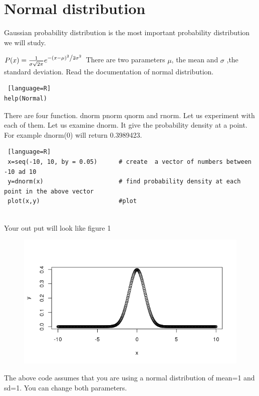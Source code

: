 \documentclass["../Applied_probabillity _and_statistics_lab_KTU.tex"]{subfiles}
\begin{document}
 \section{Normal distribution}
 Gaussian probability distribution is the most important probability distribution we will study.

 
 $P(x) = \frac{1}{{\sigma \sqrt {2\pi } }}e^{{{ - \left( {x - \mu } \right)^2 } \mathord{\left/ {\vphantom {{ - \left( {x - \mu } \right)^2 } {2\sigma ^2 }}} \right. \kern-\nulldelimiterspace} {2\sigma ^2 }}}$
 There are two parameters $\mu$, the mean and $\sigma $ ,the standard deviation.
  Read the documentation of normal distribution.
\begin{lstlisting} [language=R]
help(Normal)
 \end{lstlisting} 
 There are four  function. dnorm pnorm qnorm and rnorm. Let us experiment with each of them. 
 Let us examine dnorm. It give the probability density at a point. For example dnorm(0) will return 0.3989423.
 
 \begin{lstlisting} [language=R]
 x=seq(-10, 10, by = 0.05)      # create  a vector of numbers between -10 ad 10
 y=dnorm(x)                     # find probability density at each point in the above vector
 plot(x,y)                      #plot 
 
 \end{lstlisting}
 
 Your out put will look like figure 1
\begin{figure}
 \includegraphics[scale=.4]{../images/normal}
 \label{norm}
 \end{figure} 
 
 The above code assumes that you are using a normal distribution of mean=1 and sd=1. You can change both parameters.
 
\end{document}
